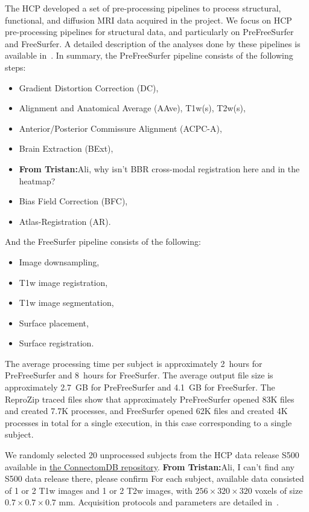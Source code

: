 \documentclass[a4paper,num-refs]{oup-contemporary}
\newcommand{\reprozip}[0]{ReproZip\xspace}
\newcommand{\tristan}[1]{\color{orange}\textbf{From Tristan:}#1\color{black}}
\begin{document}
The HCP developed a set of pre-processing pipelines to process structural,
functional, and diffusion MRI data acquired in the project. We focus on HCP
pre-processing pipelines for structural data, and particularly
on PreFreeSurfer and FreeSurfer. 
A detailed description of the analyses done by these
pipelines is available in~\cite{glasser2013}. 
In summary, the PreFreeSurfer pipeline consists of the following steps: 
\begin{itemize}
\item Gradient Distortion Correction (DC), 
\item Alignment and Anatomical Average (AAve), T1w(s), T2w(s),  
\item Anterior/Posterior Commissure Alignment (ACPC-A), 
\item Brain Extraction (BExt), 
\item \tristan{Ali, why isn't BBR cross-modal registration here and in the heatmap?}
\item Bias Field Correction (BFC), 
\item Atlas-Registration (AR).
\end{itemize}
And the FreeSurfer pipeline consists of the following:
\begin{itemize}
\item Image downsampling, 
\item T1w image registration, 
\item T1w image segmentation,
\item Surface placement, 
\item Surface registration.
\end{itemize}
The average processing time per subject is approximately 2~hours for
PreFreeSurfer and 8~hours for FreeSurfer. The average output file size is
approximately 2.7~GB for PreFreeSurfer and 4.1~GB for FreeSurfer.
The \reprozip traced files show that approximately PreFreeSurfer opened  
83K files and created 7.7K processes, and FreeSurfer opened 62K files and 
created 4K processes in total for a single execution, in this case corresponding to a single subject.

We randomly selected 20 unprocessed subjects 
from the HCP data release S500 
available in \href{https://db.humanconnectome.org}{the ConnectomDB repository}. \tristan{Ali, I can't find any S500 
data release there, please confirm}
For each subject, available data consisted of 1 or 2 T1w images and 1 or 2 T2w images, with 
$256 \times 320 \times 320$ voxels of size $0.7 \times 0.7 \times 0.7$ mm.
Acquisition protocols and parameters are detailed in~\cite{van2013wu}. 
\end{document}
